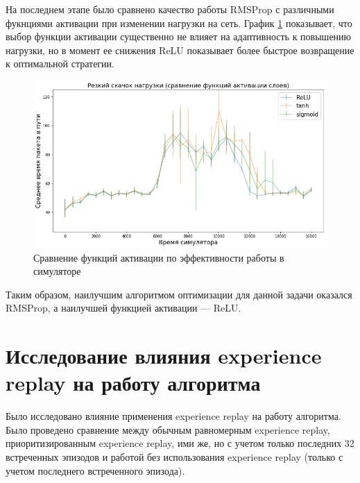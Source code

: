 \documentclass[specification, annotation]{itmo-student-thesis}
\begin{document}
На последнем этапе было сравнено качество работы RMSProp с различными фукнциями
активации при изменении нагрузки на сеть. График
\ref{experiment-activations-launch} показывает, что выбор функции активации
существенно не влияет на адаптивность к повышению нагрузки, но в момент ее
снижения ReLU показывает более быстрое возвращение к оптимальной стратегии.

\begin{figure}[!h]
  \caption{Сравнение функций активации по эффективности работы в
    симуляторе}\label{experiment-activations-launch}
  \centering
  \includegraphics[scale=0.6]{experiment-activations-launch}
\end{figure}

Таким образом, наилучшим алгоритмом оптимизации для данной задачи оказался
RMSProp, а наилучшей функцией активации --- ReLU.

\section{Исследование влияния experience replay на работу алгоритма}\label{apx:exp-replay}

Было исследовано влияние применения experience replay на работу алгоритма. Было
проведено сравнение между обычным равномерным experience replay,
приоритизированным experience replay\cite{schaul2015prioritized}, ими же, но с
учетом только последних 32 встреченных эпизодов и работой без
использования experience replay (только с учетом последнего встреченного эпизода).
\end{document}
